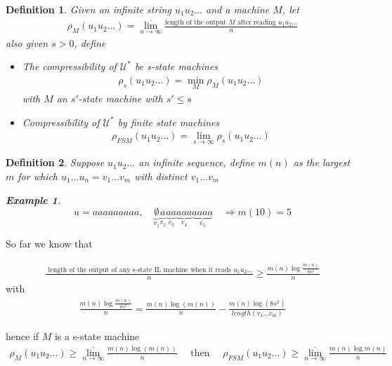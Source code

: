 \documentclass[twoside]{article}
\newtheorem{definition}{Definition}[section]
\theoremstyle{definition} %
\newtheorem{example}{Example}
\def\U{\mathcal{U}}
\begin{document}
\begin{definition}
  Given an infinite string $u_1 u_2 ...$ and a machine $M$, let
  \begin{align*}
    \rho_{M}(u_1 u_2 ...) = \overline{\lim_{n \to \infty}} \frac{\text{length of the output } M \text{ after reading } u_1 u_2...}{n}
  \end{align*}
  also given $s > 0$, define
  \begin{itemize}
    \item The compressibility of $\U^*$ be s-state machines
    \begin{align*}
      \rho_s (u_1 u_2 ...) = \min_{M} \rho_{M}(u_1 u_2 ...)
    \end{align*}
    with $M$ an $s'$-state machine with $s' \leq s$
    \item Compressibility of $\U^*$ by finite state machines
    \begin{align*}
      \rho_{FSM} (u_1 u_2 ...) = \lim_{s \to \infty} \rho_s (u_1 u_2 ...)
    \end{align*}
  \end{itemize}
\end{definition}

\begin{definition}
  Suppose $u_1 u_2 ...$ an infinite sequence, define $m(n)$ as the largest $m$ for which $u_1 ... u_n = v_1 ... v_m$ with distinct $v_1 ... v_m$
  \begin{example}
    $$ u = aaaaaaaaa, \quad \underbrace{\emptyset}_{v_1} \underbrace{a}_{v_2} \underbrace{aa}_{v_3} \underbrace{aaa}_{v_4} \underbrace{aaaa}_{v_5} \quad \Rightarrow m(10) = 5 $$
  \end{example}
\end{definition}

So far we know that

\begin{align*}
  \frac{\text{ length of the output of any s-state IL machine when it reads } u_1 u_2 ... }{n} \geq \frac{m(n) \log \frac{m(n)}{8 s^2}}{n}
\end{align*}
with
\begin{align*}
  \frac{m(n) \log \frac{m(n)}{8 s^2}}{n} = \frac{m(n) \log(m(n))}{n} - \frac{m(n) \log(8 s^2)}{length(v_1 ... v_m)}
\end{align*}

hence if $M$ is a s-state machine
\begin{align*}
  \rho_M (u_1 u_2 ...) \geq \overline{\lim_{n \to \infty}} \frac{m(n) \log(m(n))}{n}
  \quad \text{ then } \quad
  \rho_{FSM} (u_1 u_2 ...) \geq \overline{\lim_{n \to \infty}} \frac{m(n) \log m(n)}{n}
\end{align*}
\end{document}
